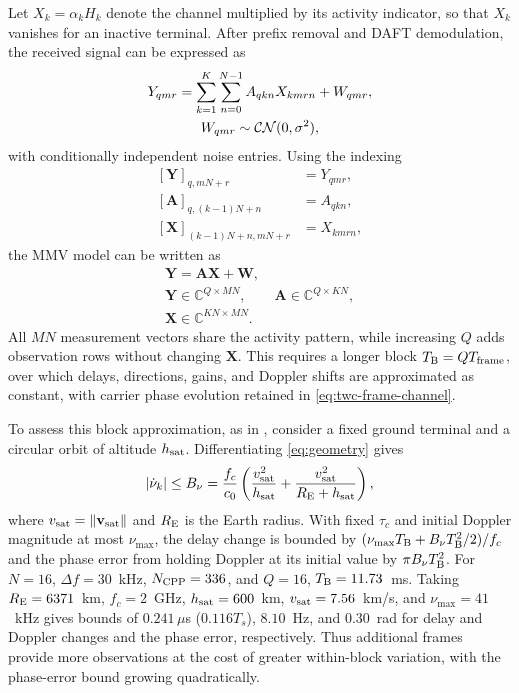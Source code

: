 Let $X_k=\alpha_kH_k$ denote the channel multiplied by its activity
indicator, so that $X_k$ vanishes for an inactive terminal.
After prefix removal and DAFT demodulation, the received signal can be expressed as
\begin{equation}
 \begin{gathered}
 Y_{qmr}=\sum_{k=1}^K\sum_{n=0}^{N-1}A_{qkn}X_{kmrn}+W_{qmr},
 \\
 W_{qmr}\sim\mathcal{CN}(0,\sigma^2),
 \end{gathered}
 \label{eq:observation-tensor}
\end{equation}
with conditionally independent noise entries.
Using the indexing
\begin{equation}
 \begin{aligned}
 [\mathbf Y]_{q,mN+r}&=Y_{qmr},\\
 [\mathbf A]_{q,(k-1)N+n}&=A_{qkn},\\
 [\mathbf X]_{(k-1)N+n,mN+r}&=X_{kmrn},
 \end{aligned}
 \label{eq:mmv-indexing}
\end{equation}
the MMV model can be written as
\begin{equation}
 \begin{gathered}
 \mathbf Y=\mathbf A\mathbf X+\mathbf W,\\
 \mathbf Y\in\mathbb C^{Q\times MN},\qquad
 \mathbf A\in\mathbb C^{Q\times KN},\\
 \mathbf X\in\mathbb C^{KN\times MN}.
 \end{gathered}
 \label{eq:mmv}
\end{equation}
All $MN$ measurement vectors share the activity pattern, while
increasing $Q$ adds observation rows without changing $\mathbf X$.
This requires a longer block $T_{\rm B}=QT_{\rm frame}$, over which
delays, directions, gains, and Doppler shifts are approximated as
constant, with carrier phase evolution retained in
\eqref{eq:twc-frame-channel}.

To assess this block approximation, as in \cite{shen2025}, consider a
fixed ground terminal and a circular orbit of altitude $h_{\rm sat}$.
Differentiating \eqref{eq:geometry} gives
\[
 |\dot\nu_k|\leq B_\nu
 =\frac{f_c}{c_0}\left(\frac{v_{\rm sat}^2}{h_{\rm sat}}
       +\frac{v_{\rm sat}^2}{R_{\rm E}+h_{\rm sat}}\right),
\]
where $v_{\rm sat}=\|\mathbf v_{\rm sat}\|$ and $R_{\rm E}$ is the
Earth radius. With fixed $\tau_c$ and initial Doppler magnitude at
most $\nu_{\max}$, the delay change is bounded by
$(\nu_{\max}T_{\rm B}+B_\nu T_{\rm B}^2/2)/f_c$ and the phase error
from holding Doppler at its initial value by $\pi B_\nu T_{\rm B}^2$. For $N=16$,
$\Delta f=30$~kHz, $N_{\rm CPP}=336$, and $Q=16$, $T_{\rm B}=11.73$~ms.
Taking $R_{\rm E}=6371$~km, $f_c=2$~GHz, $h_{\rm sat}=600$~km,
$v_{\rm sat}=7.56$~km/s, and $\nu_{\max}=41$~kHz gives bounds of
$0.241\,\mu$s ($0.116T_s$), $8.10$~Hz, and $0.30$~rad for delay
and Doppler changes and the phase error, respectively. Thus additional frames
provide more observations at the cost of greater within-block
variation, with the phase-error bound growing quadratically.

